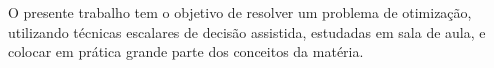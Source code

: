 O presente trabalho tem o objetivo de resolver um problema de otimização, utilizando técnicas escalares de decisão assistida, estudadas em sala de aula, e colocar em prática grande parte dos conceitos da matéria.